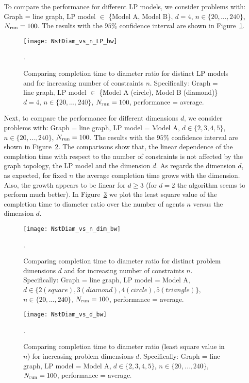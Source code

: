 \documentclass[onecolumn,journal,letterpaper]{IEEEtran}
\newcommand{\subscr}[2]{{#1}_{\textup{#2}}}
\begin{document}
To compare the performance for different
LP models, we consider problems with: Graph = line graph, LP model $\in$
\{Model A, Model B\}, $d=4$, $n\in\{20,\dots,240\}$,
$\subscr{N}{run}=100$. The results with the $95\%$ confidence interval are
shown in Figure~\ref{fig:Nst_vs_n_line_LP}.

\begin{figure}[h]
\begin{center}
\texttt{[image: NstDiam\_vs\_n\_LP\_bw]}\caption{Comparing completion time to diameter ratio for distinct LP
    models and for increasing number of constraints $n$. Specifically:
    Graph = line graph, LP model $\in$ \{Model A (circle), Model B
    (diamond)\} $d = 4$, $n\in\{20,\dots,240\}$, $\subscr{N}{run}=100$,
    performance = average.}.
  \label{fig:Nst_vs_n_line_LP}
\end{center}
\end{figure}


Next, to compare the performance for different dimensions $d$, we consider
problems with: Graph = line graph, LP model = Model A, $d\in\{2,3,4,5\}$,
$n\in\{20,\dots,240\}$, $\subscr{N}{run}=100$. The results with the $95\%$
confidence interval are shown in Figure~\ref{fig:Nst_vs_n_line_dim}.
The comparisons show that, the linear dependence of the completion time
with respect to the number of constraints is not affected by the graph
topology, the LP model and the dimension $d$. As regards the dimension $d$,
as expected, for fixed $n$ the average completion time grows with the
dimension. Also, the growth appears to be linear for $d\geq 3$ (for $d=2$
the algorithm seems to perform much better). In
Figure~\ref{fig:NstDiam_vs_d_line} we plot the least square value of the
completion time to diameter ratio over the number of agents $n$ versus the
dimension $d$.

\begin{figure}[h]
\begin{center}
\texttt{[image: NstDiam\_vs\_n\_dim\_bw]}\caption{Comparing completion time to diameter ratio for distinct problem
    dimensions $d$ and for increasing number of constraints
    $n$. Specifically: Graph = line graph, LP model = Model A, $d\in\{2
    (square),3 (diamond),4 (circle),5 (triangle)\}$,
    $n\in\{20,\dots,240\}$, $\subscr{N}{run}=100$, performance = average.}.
  \label{fig:Nst_vs_n_line_dim}
\end{center}
\end{figure}

\begin{figure}[h]
\begin{center}
\texttt{[image: NstDiam\_vs\_d\_bw]}\caption{Comparing completion time to diameter ratio (least square value
    in $n$) for increasing problem dimensions $d$. Specifically: Graph =
    line graph, LP model = Model A, $d\in\{2,3,4,5\}$,
    $n\in\{20,\dots,240\}$, $\subscr{N}{run}=100$, performance = average.}.
  \label{fig:NstDiam_vs_d_line}
\end{center}
\end{figure}
\end{document}
